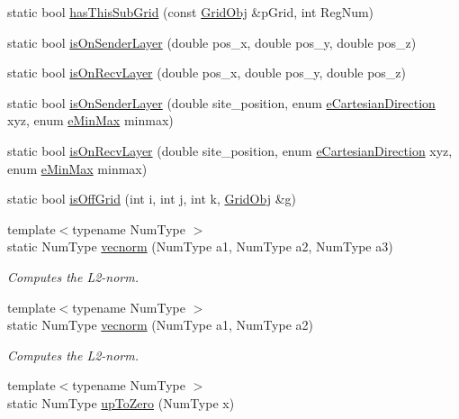 \begin{DoxyCompactItemize}
\item 
static bool \hyperlink{class_grid_utils_a0863e64842ddc907d0a2ab22b9624e07}{has\+This\+Sub\+Grid} (const \hyperlink{class_grid_obj}{Grid\+Obj} \&p\+Grid, int Reg\+Num)
\item 
static bool \hyperlink{class_grid_utils_af0692236725709af2d98872805fc84ae}{is\+On\+Sender\+Layer} (double pos\+\_\+x, double pos\+\_\+y, double pos\+\_\+z)
\item 
static bool \hyperlink{class_grid_utils_abfec29d90b6942de2f3c52c225a4d888}{is\+On\+Recv\+Layer} (double pos\+\_\+x, double pos\+\_\+y, double pos\+\_\+z)
\item 
static bool \hyperlink{class_grid_utils_a70a234125350fca607d3943e0f1edd7c}{is\+On\+Sender\+Layer} (double site\+\_\+position, enum \hyperlink{_grid_utils_8h_afbad8e4a2f1e9903755b1bd2fe8273cf}{e\+Cartesian\+Direction} xyz, enum \hyperlink{_grid_utils_8h_a8e005b039da2246588381c4feeeac43f}{e\+Min\+Max} minmax)
\item 
static bool \hyperlink{class_grid_utils_af2b6e1225cab2a840110e2a70f6bd23c}{is\+On\+Recv\+Layer} (double site\+\_\+position, enum \hyperlink{_grid_utils_8h_afbad8e4a2f1e9903755b1bd2fe8273cf}{e\+Cartesian\+Direction} xyz, enum \hyperlink{_grid_utils_8h_a8e005b039da2246588381c4feeeac43f}{e\+Min\+Max} minmax)
\item 
static bool \hyperlink{class_grid_utils_a48709fd0b88db1e79bbc3a12026fe33a}{is\+Off\+Grid} (int i, int j, int k, \hyperlink{class_grid_obj}{Grid\+Obj} \&g)
\item 
{\footnotesize template$<$typename Num\+Type $>$ }\\static Num\+Type \hyperlink{class_grid_utils_a78aa4876d7066bce253c52457e7b901d}{vecnorm} (Num\+Type a1, Num\+Type a2, Num\+Type a3)
\begin{DoxyCompactList}\small\item\em Computes the L2-\/norm. \end{DoxyCompactList}\item 
{\footnotesize template$<$typename Num\+Type $>$ }\\static Num\+Type \hyperlink{class_grid_utils_a7a169fc043a585f20936b314def45fe7}{vecnorm} (Num\+Type a1, Num\+Type a2)
\begin{DoxyCompactList}\small\item\em Computes the L2-\/norm. \end{DoxyCompactList}\item 
{\footnotesize template$<$typename Num\+Type $>$ }\\static Num\+Type \hyperlink{class_grid_utils_a5a3e26a94e62833f0a9e5a4bda066dac}{up\+To\+Zero} (Num\+Type x)

\end{DoxyCompactItemize}
